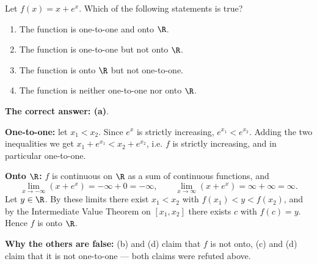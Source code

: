 
\begin{question}
Let $f(x)=x+e^x$. Which of the following statements is true?
\begin{enumerate}
  \item The function is one-to-one and onto $\R$.
  \item The function is one-to-one but not onto $\R$.
  \item The function is onto $\R$ but not one-to-one.
  \item The function is neither one-to-one nor onto $\R$.
\end{enumerate}
\end{question}

\begin{solution}
\textbf{The correct answer: (a)}.

\textbf{One-to-one:} let $x_1<x_2$. Since $e^x$ is strictly increasing, $e^{x_1}<e^{x_2}$. Adding the two inequalities we get $x_1+e^{x_1}<x_2+e^{x_2}$, i.e. $f$ is strictly increasing, and in particular one-to-one.

\textbf{Onto $\R$:} $f$ is continuous on $\R$ as a sum of continuous functions, and
\[
\lim_{x\to-\infty}(x+e^x)=-\infty+0=-\infty,\qquad \lim_{x\to\infty}(x+e^x)=\infty+\infty=\infty .
\]
Let $y\in\R$. By these limits there exist $x_1<x_2$ with $f(x_1)<y<f(x_2)$, and by the Intermediate Value Theorem on $[x_1,x_2]$ there exists $c$ with $f(c)=y$. Hence $f$ is onto $\R$.

\textbf{Why the others are false:} (b) and (d) claim that $f$ is not onto, (c) and (d) claim that it is not one-to-one --- both claims were refuted above.
\end{solution}
